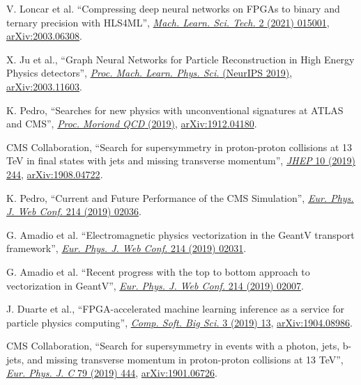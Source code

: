 \begin{description}[leftmargin=12pt,font=\normalfont,labelsep=0em]
\item V. Loncar et al. ``Compressing deep neural networks on FPGAs to binary and ternary precision with HLS4ML'', \href{https://doi.org/10.1088/2632-2153/aba042}{\emph{Mach. Learn. Sci. Tech.} 2 (2021) 015001}, \href{https://arxiv.org/abs/2003.06308}{arXiv:2003.06308}. %
\item X. Ju et al., ``Graph Neural Networks for Particle Reconstruction in High Energy Physics detectors'', \href{https://ml4physicalsciences.github.io/2019/#papers}{\emph{Proc. Mach. Learn. Phys. Sci.} (NeurIPS 2019)}, \href{https://arxiv.org/abs/2003.11603}{arXiv:2003.11603}. %
\item K. Pedro, ``Searches for new physics with unconventional signatures at ATLAS and CMS'', \href{http://moriond.in2p3.fr/previous-sessions.html}{\emph{Proc. Moriond QCD} (2019)}, \href{https://arxiv.org/abs/1912.04180}{arXiv:1912.04180}. %
\item CMS Collaboration, ``Search for supersymmetry in proton-proton collisions at 13 TeV in final states with jets and missing transverse momentum'', \href{http://dx.doi.org/10.1007/JHEP10(2019)244}{\emph{JHEP} 10 (2019) 244}, \href{https://arxiv.org/abs/1908.04722}{arXiv:1908.04722}. %
\item K. Pedro, ``Current and Future Performance of the CMS Simulation'', \href{https://doi.org/10.1051/epjconf/201921402036}{\emph{Eur. Phys. J. Web Conf.} 214 (2019) 02036}. %
\item G. Amadio et al. ``Electromagnetic physics vectorization in the GeantV transport framework'', \href{https://doi.org/10.1051/epjconf/201921402031}{\emph{Eur. Phys. J. Web Conf.} 214 (2019) 02031}. %
\item G. Amadio et al. ``Recent progress with the top to bottom approach to vectorization in GeantV'', \href{https://doi.org/10.1051/epjconf/201921402007}{\emph{Eur. Phys. J. Web Conf.} 214 (2019) 02007}. %
\item \begin{sloppypar}J. Duarte et al., ``FPGA-accelerated machine learning inference as a service for particle physics computing'', \href{https://doi.org/10.1007/s41781-019-0027-2}{\emph{Comp. Soft. Big Sci.} 3 (2019) 13}, \href{https://arxiv.org/abs/1904.08986}{arXiv:1904.08986}.\end{sloppypar} %
\item CMS Collaboration, ``Search for supersymmetry in events with a photon, jets, b-jets, and missing transverse momentum in proton-proton collisions at 13 TeV'', \href{http://dx.doi.org/10.1140/epjc/s10052-019-6926-x}{\emph{Eur. Phys. J. C} 79 (2019) 444}, \href{https://arxiv.org/abs/1901.06726}{arXiv:1901.06726}. %

\end{description}
